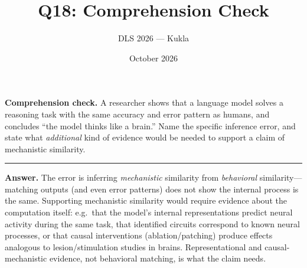 \documentclass[11pt]{article}
\title{Q18: Comprehension Check}
\author{DLS 2026 --- Kukla}
\date{October 2026}
\begin{document}
\maketitle
\textbf{Comprehension check.} A researcher shows that a language model solves a reasoning task with the
same accuracy and error pattern as humans, and concludes ``the model thinks like a brain.'' Name the
specific inference error, and state what \emph{additional} kind of evidence would be needed to support a
claim of mechanistic similarity.

\vspace{0.8cm}\hrule\vspace{4pt}
{\small\textbf{Answer.} The error is inferring \emph{mechanistic} similarity from \emph{behavioral}
similarity---matching outputs (and even error patterns) does not show the internal process is the same.
Supporting mechanistic similarity would require evidence about the computation itself: e.g.\ that the
model's internal representations predict neural activity during the same task, that identified circuits
correspond to known neural processes, or that causal interventions (ablation/patching) produce
effects analogous to lesion/stimulation studies in brains. Representational and causal-mechanistic
evidence, not behavioral matching, is what the claim needs.}
\end{document}
